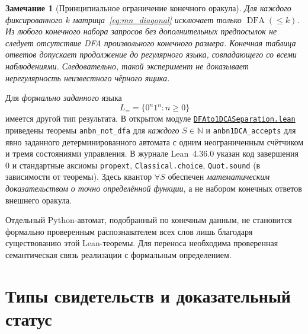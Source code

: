 \documentclass[11pt,a4paper]{article}
\newtheorem{remark}{Замечание}[section]
\newcommand{\DFA}{\operatorname{DFA}}
\begin{document}
\begin{remark}[Принципиальное ограничение конечного оракула]\label{rem:oracle}
Для каждого \emph{фиксированного} $k$ матрица~\eqref{eq:mn_diagonal} исключает только $\DFA(\le k)$. Из любого конечного набора запросов без дополнительных предпосылок \emph{не следует} отсутствие DFA произвольного конечного размера. Конечная таблица ответов допускает продолжение до регулярного языка, совпадающего со всеми наблюдениями. Следовательно, такой эксперимент не доказывает нерегулярность неизвестного чёрного ящика.
\end{remark}

Для \emph{формально заданного} языка
\begin{equation}\label{eq:anbn}
L_{=}=\{0^n1^n:n\ge0\}
\end{equation}
имеется другой тип результата. В открытом модуле \href{https://github.com/Dnarts/proof-carrying-discovery/blob/main/formal/DFAto1DCASeparation.lean}{\texttt{DFAto1DCASeparation.lean}} приведены теоремы \texttt{anbn\_not\_dfa} для \emph{каждого} $S\in\mathbb N$ и \texttt{anbn1DCA\_accepts} для явно заданного детерминированного автомата с одним неограниченным счётчиком и тремя состояниями управления. В журнале Lean~4.36.0 указан код завершения $0$ и стандартные аксиомы \texttt{propext}, \texttt{Classical.choice}, \texttt{Quot.sound} (в зависимости от теоремы). Здесь квантор $\forall S$ обеспечен \emph{математическим доказательством о точно определённой функции}, а не набором конечных ответов внешнего оракула.

Отдельный Python-автомат, подобранный по конечным данным, не становится формально проверенным распознавателем всех слов лишь благодаря существованию этой Lean-теоремы. Для переноса необходима проверенная семантическая связь реализации с формальным определением.

\section{Типы свидетельств и доказательный статус}
\end{document}
